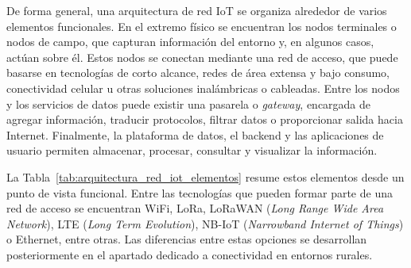 De forma general, una arquitectura de red IoT se organiza alrededor de varios elementos funcionales. En el extremo físico se encuentran los nodos terminales o nodos de campo, que capturan información del entorno y, en algunos casos, actúan sobre él. Estos nodos se conectan mediante una red de acceso, que puede basarse en tecnologías de corto alcance, redes de área extensa y bajo consumo, conectividad celular u otras soluciones inalámbricas o cableadas. Entre los nodos y los servicios de datos puede existir una pasarela o \textit{gateway}, encargada de agregar información, traducir protocolos, filtrar datos o proporcionar salida hacia Internet. Finalmente, la plataforma de datos, el backend y las aplicaciones de usuario permiten almacenar, procesar, consultar y visualizar la información.

La Tabla~\ref{tab:arquitectura_red_iot_elementos} resume estos elementos desde un punto de vista funcional. Entre las tecnologías que pueden formar parte de una red de acceso se encuentran WiFi, LoRa, LoRaWAN (\textit{Long Range Wide Area Network}), LTE (\textit{Long Term Evolution}), NB-IoT (\textit{Narrowband Internet of Things}) o Ethernet, entre otras. Las diferencias entre estas opciones se desarrollan posteriormente en el apartado dedicado a conectividad en entornos rurales.

\begingroup
\small
\renewcommand{\arraystretch}{1.15}

